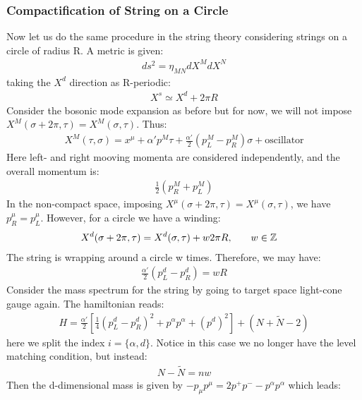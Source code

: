 \subsubsection{Compactification of String on a Circle}
Now let us do the same procedure in the string theory considering strings on a circle of radius R. A metric is given:
\begin{align}
    \label{eq:metric}
    ds^{2} = \eta _{MN} dX^{M} dX^{N}
\end{align}
taking the $X^{d}$ direction as R-periodic:
\begin{align}
    X^{s} \simeq X^{d} + 2\pi R
\end{align}
Consider the bosonic mode expansion as before but for now, we will not impose $X^{M} (\sigma + 2\pi, \tau) = X^{M} (\sigma,\tau)$. Thus:
\begin{align}
    X^{M} (\tau, \sigma) = x^{\mu} + \alpha' p^{M} \tau + \frac{\alpha'}{2}(p_{L}^{M} - p_{R}^{M}) \sigma + \text{oscillator}
\end{align}
Here left- and right mooving momenta are considered independently, and the overall momentum is:
\begin{align}
    \frac{1}{2} (p_{R}^{M} + p_{L} ^{M})
\end{align}
In the non-compact space, imposing $X^{\mu} (\sigma+2\pi, \tau) = X^{\mu}(\sigma,\tau)$, we have $p_{R}^{\mu} = p_{L}^{\mu}$. However, for a circle we have a winding:
\begin{align}
    X^{d} (\sigma +2\pi, \tau) = X^{d} (\sigma,\tau) + w 2\pi R ,& \qq{} w \in \mathbb{Z}
\end{align}
The string is wrapping around a circle w times. Therefore, we may have:
\begin{align}
    \frac{\alpha'}{2} (p_{L}^{d} - p_{R}^{d}) =wR
\end{align}
Consider the mass spectrum for the string by going to target space light-cone gauge again. The hamiltonian reads:
\begin{align}
    H = \frac{\alpha'}{2} \left[ \frac{1}{4} (p_{L}^{d} -p_{R}^{d})^{2} +p^{\alpha} p^{\alpha} + (p^{d})^{2} \right] + (N + \tilde{N} -2)
\end{align}
here we split the index $i = \lbrace \alpha, d \rbrace$. Notice in this case we no longer have the level matching condition, but instead:
\begin{align}
    N-\tilde{N} = nw
\end{align} 
Then the d-dimensional mass is given by $-p_{\mu} p^{\mu} = 2p^{+} p^{-} - p^{\alpha} p^{\alpha}$ which leads:
